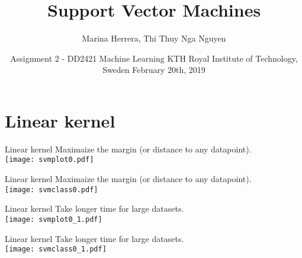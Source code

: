 \documentclass[unknownkeysallowed,10pt]{beamer}
\title[SVM] %
{Support Vector Machines}
\author[Marina Herrera, Nga Nguyen]
{
{\large Marina Herrera, Thi Thuy Nga Nguyen}
}
\date[February 2019] %
{
\small Assignment 2 - DD2421 Machine Learning
\vskip1.5pt
\small KTH Royal Institute of Technology, Sweden
\vskip6pt
\small February 20th, 2019
}
\theoremstyle{definition} \newtheorem{rem}[thm]{Remark} \newtheorem*{rem*}{Remark}
\begin{document}
\begin{frame}
  \titlepage
\end{frame}





\section{Linear kernel}

\begin{frame}{Linear kernel}
\vskip6pt
Maximaize the margin (or distance to any datapoint).\\
\centering
\texttt{[image: svmplot0.pdf]}
\end{frame}

\begin{frame}[noframenumbering]{Linear kernel}
\vskip6pt
Maximaize the margin (or distance to any datapoint).\\
\centering
\texttt{[image: svmclass0.pdf]}
\end{frame}

\begin{frame}{Linear kernel}
\vskip6pt
Take longer time for large datasets.\\
\centering
\texttt{[image: svmplot0\_1.pdf]}
\end{frame}

\begin{frame}[noframenumbering]{Linear kernel}
\vskip6pt
Take longer time for large datasets.\\
\centering
\texttt{[image: svmclass0\_1.pdf]}
\end{frame}
\end{document}
